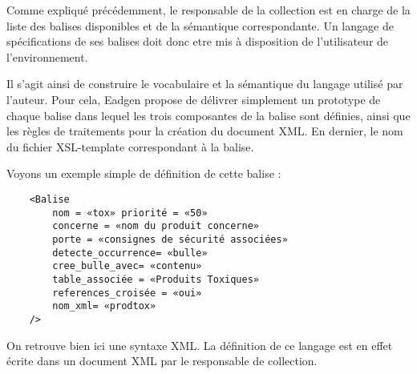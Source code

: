 Comme expliqué précédemment, le responsable de la collection est en 
charge de la liste des balises disponibles et de la sémantique
correspondante. Un langage de spécifications de ses balises doit
donc etre mis à disposition de l'utilisateur de l'environnement.

Il s'agit ainsi de construire le vocabulaire et la sémantique
du langage utilisé par l'auteur. Pour cela, Eadgen propose de délivrer
simplement un prototype de chaque balise dans lequel les trois
composantes de la balise sont définies, ainsi que les règles
de traitements pour la création du document XML. En dernier, le
nom du fichier XSL-template correspondant à la balise. 

Voyons un exemple simple de définition de cette balise : 
\begin{verbatim}
	<Balise
		nom = «tox» priorité = «50»
		concerne = «nom du produit concerne»
		porte = «consignes de sécurité associées»
		detecte_occurrence= «bulle»
		cree_bulle_avec= «contenu»
		table_associée = «Produits Toxiques»
		references_croisée = «oui»
		nom_xml= «prodtox»
	/>
\end{verbatim} 
On retrouve bien ici une syntaxe XML. La définition de ce langage est
en effet écrite dans un document XML par le responsable de collection.